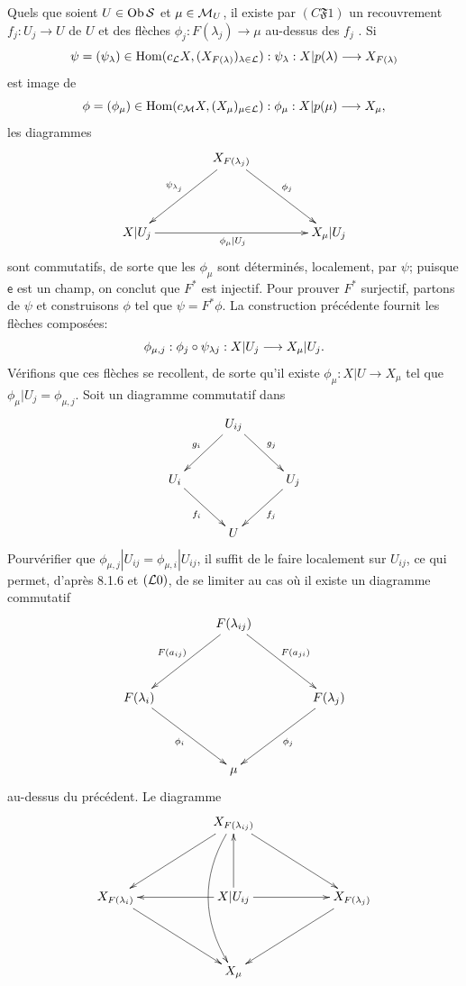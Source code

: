\documentclass[10pt]{../fichiers-configuration-latex/smfart}
\begin{document}
Quels que soient $U \in \operatorname{Ob} {\mathcal S}$ et $\mu \in {\mathcal M}_U$, il existe
par $(C \mathfrak{F} 1)$ un recouvrement $f_j : U_j \to U$ de $U$ et
des flèches $\phi_j : F(\lambda_j) \to \mu$ au-dessus des $f_j$ . Si
$$
\psi = (\psi_{\lambda}) \in \Hom(c_{\Ll} X,
(X_{F(\lambda)})_{\lambda \in \Ll}) : \psi_{\lambda} : X |
  p(\lambda) \to X_{F(\lambda)}
$$
est image de
$$
\phi = (\phi_{\mu}) \in \Hom(c_{\Mm} X,
(X_{\mu})_{\mu \in \Ll}) : \phi_{\mu} : X |
  p(\mu) \to X_{\mu},
$$
les diagrammes
\[
\xymatrix@=1.5cm{
                               & X_{F(\lambda_j)}
                               \ar[ld]_{\psi_{\lambda_j}} \ar[rd]^{\phi_j}&        \\
X|U_j \ar[rr]_{\phi_{\mu}|U_j} &                  & X_{\mu}|U_j
}
\]
sont commutatifs, de sorte que les $\phi_{\mu}$ sont déterminés,
localement, par $\psi$; puisque $\mathsf{e}$ est un champ, on
conclut que $F^{\ast}$ est injectif. Pour prouver $F^{\ast}$
surjectif, partons de $\psi$ et construisons $\phi$ tel que $\psi =
F^{\ast} \phi$. La construction précédente fournit les flèches
composées:
$$
\phi_{\mu, j} : \phi_j \circ \psi_{\lambda j} : X | U_j \to X_{\mu} | U_j{\quoi}.
$$
Vérifions que ces flèches se recollent, de sorte qu'il existe
$\phi_{\mu} : X | U \to X_{\mu}$ tel que $\phi_{\mu} | U_{j} =
\phi_{\mu, j}$. Soit un diagramme commutatif dans
\[
\xymatrix@=1cm{
                 & U_{ij}\ar[ld]_{g_i} \ar[rd]^{g_j}     &            \\
U_i  \ar[rd]_{f_i}            &            & U_j \ar[ld]^{f_j}\\
                 &  U     &             \\
}
\]
Pour\pageoriginale vérifier que $\phi_{\mu, j} | U_{ij} = \phi_{\mu, i} | U_{ij}$,
il suffit de le faire localement sur $U_{ij}$, ce qui permet,
d'après 8.1.6 et $({\mathcal L}0)$, de se limiter au cas où il
existe un diagramme commutatif
\[
\xymatrix@=1.5cm{
             & F(\lambda_{ij}) \ar[ld]_{F(a_{ij})} \ar[rd]^{F(a_{ji})} &\\
F(\lambda_i) \ar[rd]_{\phi_i}&                 & F(\lambda_{j}) \ar[ld]^{\phi_j}\\
             & \mu             &
}
\]
au-dessus du précédent. Le diagramme
\[
\xymatrix@R=1.5cm@C=2cm{
  & X_{F(\lambda_{ij})} \ar[ld] \ar[rd] \ar@/_1.68pc/[dd]&\\
X_{F(\lambda_i)}\ar[rd] & X|U_{i j}\ar[u]\ar[l]\ar[r]           & X_{F(\lambda_j)} \ar[ld]\\
                 & X_{\mu}             &
}
\]
\end{document}
